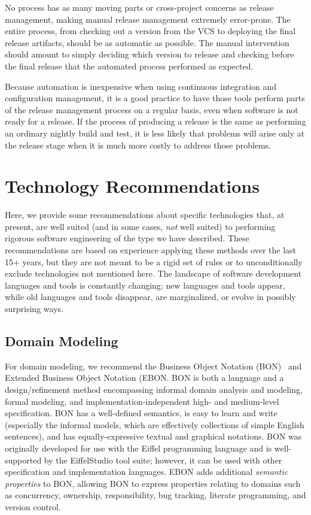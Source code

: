 No process has as many moving parts or cross-project concerns as
release management, making manual release management extremely
error-prone. The entire process, from checking out a version from the
VCS to deploying the final release artifacts, should be as automatic
as possible. The manual intervention should amount to simply deciding
which version to release and checking before the final release that
the automated process performed as expected.

Because automation is inexpensive when using continuous integration
and configuration management, it is a good practice to have those
tools perform parts of the release management process on a regular
basis, even when software is not ready for a release. If the process
of producing a release is the same as performing an ordinary nightly
build and test, it is less likely that problems will arise only at the
release stage when it is much more costly to address those problems.

\section{Technology Recommendations}
\label{sec:technologies}

Here, we provide some recommendations about specific technologies
that, at present, are well suited (and in some cases, \emph{not} well
suited) to performing rigorous software engineering of the type we
have described. These recommendations are based on experience applying
these methods over the last 15+ years, but they are not meant to be a
rigid set of rules or to unconditionally exclude technologies not
mentioned here. The landscape of software development languages and
tools is constantly changing; new languages and tools appear, while
old languages and tools disappear, are marginalized, or evolve in
possibly surprising ways.

\subsection{Domain Modeling}

For domain modeling, we recommend the Business Object Notation
(BON)~\cite{walden1995seamless} and Extended Business Object Notation
(EBON. BON is both a language and a design/refinement method
encompassing informal domain analysis and modeling, formal modeling,
and implementation-independent high- and medium-level
specification. BON has a well-defined semantics, is easy to learn and
write (especially the informal models, which are effectively
collections of simple English sentences), and has equally-expressive
textual and graphical notations. BON was originally developed for use
with the Eiffel programming language and is well-supported by the
EiffelStudio tool suite; however, it can be used with other
specification and implementation languages. EBON adds additional
\emph{semantic properties} to BON, allowing BON to express properties
relating to domains such as concurrency, ownership, responsibility,
bug tracking, literate programming, and version control.

